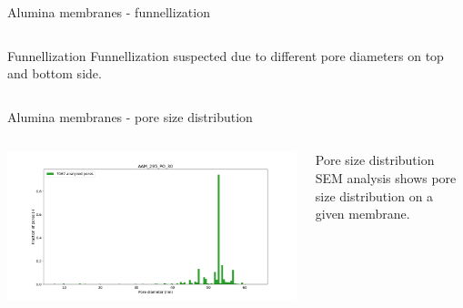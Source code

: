 \documentclass{beamer}
\begin{document}
\begin{frame}{Alumina membranes - funnellization}
\begin{columns}[onlytextwidth, T]
        \begin{block}{Funnellization}
          Funnellization suspected due to different pore diameters on top\\ and bottom side.
        \end{block}
    \end{columns}
  \end{frame}



  \begin{frame}{Alumina membranes - pore size distribution}
    \begin{columns}[onlytextwidth, T]
        \includegraphics[width=\linewidth]{images/AAM_295_PO_30_hist.png}
        \begin{block}{Pore size distribution}
          SEM analysis shows pore size distribution on a given membrane.
        \end{block}
    \end{columns}
  \end{frame}
\end{document}

